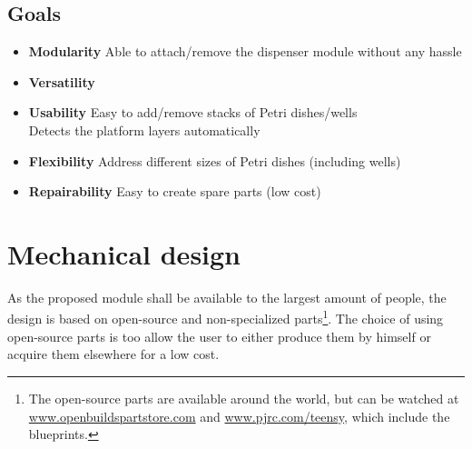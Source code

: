 \documentclass{sigchi}
\begin{document}
	\subsection{Goals}
	
	
	\begin{itemize}
		\item \textbf{Modularity} Able to attach/remove the dispenser module without any hassle
		\item \textbf{Versatility }
		\item \textbf{Usability} 	Easy to add/remove stacks of Petri dishes/wells\\
		Detects the platform layers automatically\\
		\item \textbf{Flexibility} Address different sizes of Petri dishes (including wells)
		\item \textbf{Repairability} Easy to create spare parts (low cost)
		
			
	\end{itemize}
	
	
	\section{Mechanical design}
	As the proposed module shall be available to the largest amount of people, the design is based on open-source and non-specialized parts\footnote{The open-source parts are available around the world, but can be watched at \url{www.openbuildspartstore.com} and \url{www.pjrc.com/teensy}, which include the blueprints.}. The choice of using open-source parts is too allow the user to either produce them by himself or acquire them elsewhere for a low cost. 
	
\end{document}
